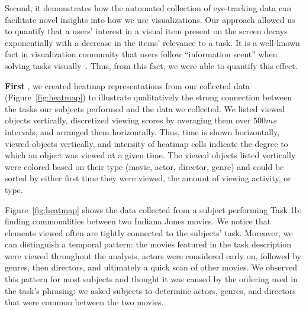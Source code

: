 Second, it demonstrates how the automated collection of eye-tracking data can facilitate novel insights into how we use visualizations. Our approach allowed us to quantify that a users' interest in a visual item present on the screen decays exponentially with a decrease in the items' relevance to a task. It is a well-known fact in visualization community that users follow ``information scent'' when solving tasks visually~\cite{informationscent2003}. Thus, from this fact, we were able to quantify this effect. 
 
\vspace{2mm}\noindent
\textbf{First }, we created heatmap representations from our collected data (Figure~\ref{fig:heatmap}) to illustrate qualitatively the strong connection between the tasks our subjects performed and the data we collected. We listed viewed objects vertically, discretized viewing scores by averaging them over $500ms$ intervals, and arranged them horizontally. Thus, time is shown horizontally, viewed objects vertically, and intensity of heatmap cells indicate the degree to which an object was viewed at a given time. The viewed objects listed vertically were colored based on their type (movie, actor, director, genre) and could be sorted by either first time they were viewed, the amount of viewing activity, or type.

Figure~\ref{fig:heatmap} shows the data collected from a subject performing Task 1b: finding commonalities between two Indiana Jones movies. We notice that elements viewed often are tightly connected to the subjects'  task.   Moreover, we can distinguish a temporal pattern: the movies featured in the task description were viewed throughout the analysis, actors were considered early on, followed by genres, then directors, and ultimately a quick scan of other movies. We observed this pattern for most subjects and thought it was caused by the ordering used in the task's phrasing: we asked subjects to determine actors, genres, and directors that were common between the two movies.   

